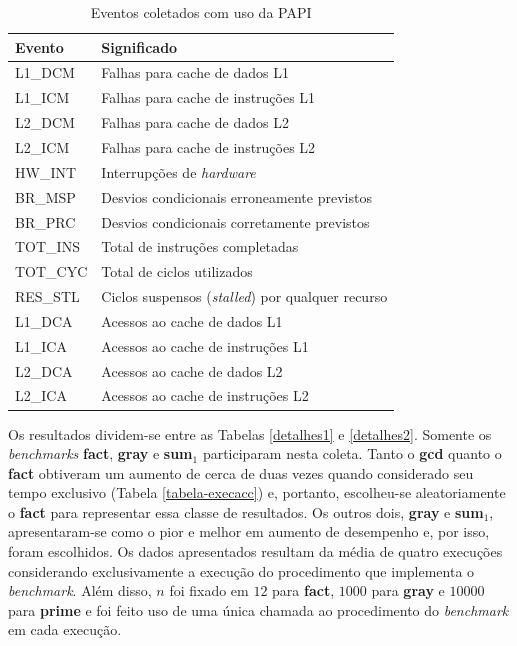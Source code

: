 \begin{table}[ht!]
  \caption{Eventos coletados com uso da PAPI \label{eventospapi}}
  \centering
  \begin{tabular}{l l}
    \toprule
    Evento & Significado \\
    \midrule
    L1\_DCM & Falhas para cache de dados L1 \\
    L1\_ICM & Falhas para cache de instruções L1 \\
    L2\_DCM & Falhas para cache de dados L2 \\
    L2\_ICM & Falhas para cache de instruções L2 \\
    HW\_INT & Interrupções de \textit{hardware} \\
    BR\_MSP & Desvios condicionais erroneamente previstos \\
    BR\_PRC & Desvios condicionais corretamente previstos \\
    TOT\_INS & Total de instruções completadas \\
    TOT\_CYC & Total de ciclos utilizados \\
    RES\_STL & Ciclos suspensos (\textit{stalled}) por qualquer recurso\\
    L1\_DCA & Acessos ao cache de dados L1 \\
    L1\_ICA & Acessos ao cache de instruções L1 \\
    L2\_DCA & Acessos ao cache de dados L2 \\
    L2\_ICA & Acessos ao cache de instruções L2 \\
    \bottomrule
  \end{tabular}
\end{table}

Os resultados dividem-se entre as Tabelas \ref{detalhes1} e
\ref{detalhes2}. Somente os \textit{benchmarks} \textbf{fact},
\textbf{gray} e \textbf{sum$_1$} participaram nesta coleta. Tanto o
\textbf{gcd} quanto o \textbf{fact} obtiveram um aumento de cerca de
duas vezes quando considerado seu tempo exclusivo (Tabela
\ref{tabela-execacc}) e, portanto, escolheu-se aleatoriamente o
\textbf{fact} para representar essa classe de resultados. Os outros
dois, \textbf{gray} e \textbf{sum$_1$}, apresentaram-se como o pior e
melhor em aumento de desempenho e, por isso, foram escolhidos.
Os dados apresentados resultam da média de quatro execuções
considerando exclusivamente a execução do procedimento que implementa
o \textit{benchmark}. Além disso, $n$ foi fixado em $12$ para
\textbf{fact}, $1000$ para \textbf{gray} e $10000$ para
\textbf{prime} e foi feito uso de uma única chamada ao procedimento
do \textit{benchmark} em cada execução.

